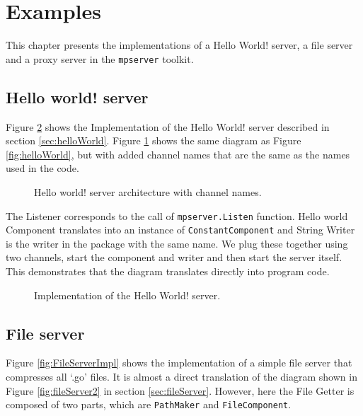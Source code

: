 \section{Examples}
\label{sec:examples}
This chapter presents the implementations of a Hello World! server,
a file server and a proxy server in the \texttt{mpserver} toolkit.

\subsection{Hello world! server}
Figure \ref{fig:HelloWorldImpl} shows the Implementation of the Hello World!
server described in section \ref{sec:helloWorld}. Figure \ref{fig:helloWorld2}
shows the same diagram as Figure \ref{fig:helloWorld}, but with
added channel names that are the same as the names used in the code.

\begin{figure}[h]
\centering
{}
\caption[scale=1.0]{Hello world! server architecture with channel names.}
\label{fig:helloWorld2}
\end{figure}

The Listener corresponds to the call of \texttt{mpserver.Listen} function.
Hello world Component translates into an instance of \texttt{ConstantComponent}
and String Writer is the writer in the package with the same name.
We plug these together using two channels, start the component and writer 
and then start the server itself. This demonstrates that the diagram translates
directly into program code.

\begin{figure}[h]
\centering

\caption[scale=1.0]{Implementation of the Hello World! server.}
\label{fig:HelloWorldImpl}
\end{figure}

\newpage
\subsection{File server}
Figure \ref{fig:FileServerImpl} shows the implementation of a simple 
file server that compresses all `.go' files. It is almost a direct translation
of the diagram shown in Figure \ref{fig:fileServer2} in section \ref{sec:fileServer}.
However, here the File Getter is composed of two parts, which are \texttt{PathMaker}
and \texttt{FileComponent}.

